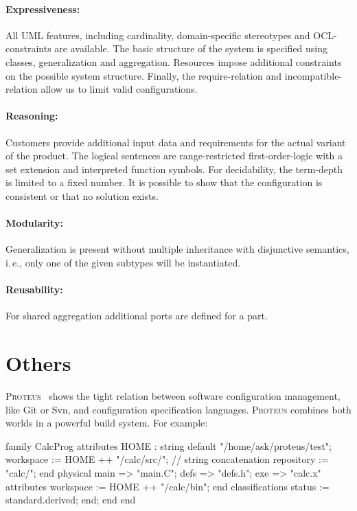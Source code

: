 \paragraph*{Expressiveness:}
All UML features, including cardinality, domain-specific stereotypes and OCL-constraints are available.
The basic structure of the system is specified using classes, generalization and aggregation.
Resources impose additional constraints on the possible system structure.
Finally, the require-relation and incompatible-relation allow us to limit valid configurations.

\paragraph*{Reasoning:}
Customers provide additional input data and requirements for the actual variant of the product.
The logical sentences are range-restricted first-order-logic with a set extension and interpreted function symbols.
For decidability, the term-depth is limited to a fixed number.
It is possible to show that the configuration is consistent or that no solution exists.

\paragraph*{Modularity:}
Generalization is present without multiple inheritance with disjunctive semantics, i.\,e., only one of the given subtypes will be instantiated.

\paragraph*{Reusability:}
For shared aggregation additional ports are defined for a part.


\section{Others}

\textsc{Proteus}~\cite{tryggeseth1995modelling} shows the tight relation between software configuration management, like Git or Svn, and configuration specification languages.
\textsc{Proteus} combines both worlds in a powerful build system.
For example:

\begin{code}[basicstyle=\tiny,morekeywords={family,attributes,end,physical,default,classifications},gobble=4,language=]
family CalcProg
	attributes
		HOME : string default "/home/ask/proteus/test";
		workspace := HOME ++ "/calc/src/"; // string concatenation
		repository := "calc/";
		end
	physical
		main => "main.C";
		defs => "defs.h";
		exe => "calc.x" attributes workspace := HOME ++ "/calc/bin"; end
		classifications status := standard.derived; end;
	end
end
\end{code}

